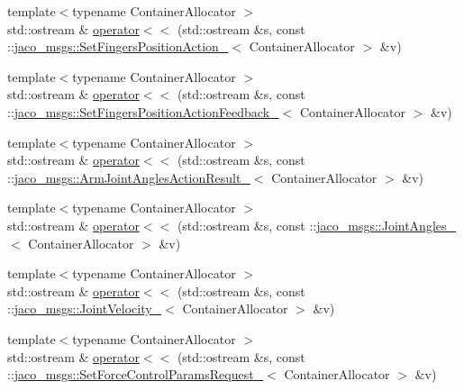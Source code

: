 \begin{DoxyCompactItemize}
{\footnotesize template$<$typename Container\+Allocator $>$ }\\std\+::ostream \& \hyperlink{namespacejaco__msgs_a3e47a12211a076c0a72bf04a136094f5}{operator$<$$<$} (std\+::ostream \&s, const \+::\hyperlink{structjaco__msgs_1_1SetFingersPositionAction__}{jaco\+\_\+msgs\+::\+Set\+Fingers\+Position\+Action\+\_\+}$<$ Container\+Allocator $>$ \&v)
\item 
{\footnotesize template$<$typename Container\+Allocator $>$ }\\std\+::ostream \& \hyperlink{namespacejaco__msgs_aaf6ed1c1fd7434eda353d6b5a70f12fe}{operator$<$$<$} (std\+::ostream \&s, const \+::\hyperlink{structjaco__msgs_1_1SetFingersPositionActionFeedback__}{jaco\+\_\+msgs\+::\+Set\+Fingers\+Position\+Action\+Feedback\+\_\+}$<$ Container\+Allocator $>$ \&v)
\item 
{\footnotesize template$<$typename Container\+Allocator $>$ }\\std\+::ostream \& \hyperlink{namespacejaco__msgs_afd55ffc64a85c12d494fe8e51a5d2188}{operator$<$$<$} (std\+::ostream \&s, const \+::\hyperlink{structjaco__msgs_1_1ArmJointAnglesActionResult__}{jaco\+\_\+msgs\+::\+Arm\+Joint\+Angles\+Action\+Result\+\_\+}$<$ Container\+Allocator $>$ \&v)
\item 
{\footnotesize template$<$typename Container\+Allocator $>$ }\\std\+::ostream \& \hyperlink{namespacejaco__msgs_a8e299671c265ba422f8b3d423e2f9199}{operator$<$$<$} (std\+::ostream \&s, const \+::\hyperlink{structjaco__msgs_1_1JointAngles__}{jaco\+\_\+msgs\+::\+Joint\+Angles\+\_\+}$<$ Container\+Allocator $>$ \&v)
\item 
{\footnotesize template$<$typename Container\+Allocator $>$ }\\std\+::ostream \& \hyperlink{namespacejaco__msgs_afdfb4e85e6c37c07fbc3c2720ed3b39a}{operator$<$$<$} (std\+::ostream \&s, const \+::\hyperlink{structjaco__msgs_1_1JointVelocity__}{jaco\+\_\+msgs\+::\+Joint\+Velocity\+\_\+}$<$ Container\+Allocator $>$ \&v)
\item 
{\footnotesize template$<$typename Container\+Allocator $>$ }\\std\+::ostream \& \hyperlink{namespacejaco__msgs_ab8c153559c90e760f0a3af6f6e0fb456}{operator$<$$<$} (std\+::ostream \&s, const \+::\hyperlink{structjaco__msgs_1_1SetForceControlParamsRequest__}{jaco\+\_\+msgs\+::\+Set\+Force\+Control\+Params\+Request\+\_\+}$<$ Container\+Allocator $>$ \&v)
\end{DoxyCompactItemize}


